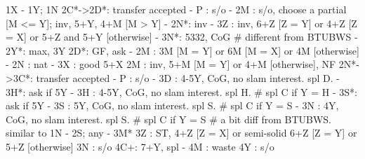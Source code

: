 1X - 1Y; 1N
2C*->2D*: transfer accepted
        - P  : s/o
        - 2M : s/o, choose a partial [M <= Y]; inv, 5+Y, 4+M [M > Y]
        - 2N*: inv
        - 3Z : inv, 6+Z [Z = Y] or 4+Z [Z = X] or 5+Z and 5+Y [otherwise]
        - 3N*: 5332, CoG  # different from BTUBWS
   - 2Y*: max, 3Y
2D*: GF, ask 
   - 2M : 3M [M = Y] or 6M [M = X] or 4M [otherwise]
   - 2N : nat
   - 3X : good 5+X
2M : inv, 5+M [M = Y] or 4+M [otherwise], NF
2N*->3C*: transfer accepted
        - P  : s/o
        - 3D : 4-5Y, CoG, no slam interest. spl D.
             - 3H*: ask if 5Y
        - 3H : 4-5Y, CoG, no slam interest. spl H.  # spl C if Y = H
             - 3S*: ask if 5Y
        - 3S : 5Y, CoG, no slam interest. spl S.  # spl C if Y = S
        - 3N : 4Y, CoG, no slam interest. spl S.  # spl C if Y = S
        # a bit diff from BTUBWS. similar to 1N - 2S; any - 3M*
3Z : ST, 4+Z [Z = X] or semi-solid 6+Z [Z = Y] or 5+Z [otherwise]
3N : s/o
4C+: 7+Y, spl  
   - 4M : waste
4Y : s/o
